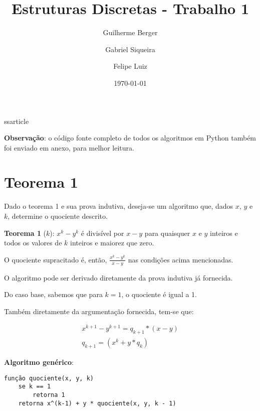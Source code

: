 ss{article}

\usepackage[english]{babel}
\usepackage[utf8]{inputenc}
\usepackage{amsmath}
\usepackage{graphicx}
\usepackage{fancyvrb}
\usepackage{fullpage}
\usepackage{float}
\usepackage{amsmath}
\usepackage{color}
\usepackage{spverbatim}





\title{Estruturas Discretas - Trabalho 1}

\author{Guilherme Berger \and Gabriel Siqueira \and Felipe Luiz}

\date{\today}


\maketitle

\textbf{Observação}: o código fonte completo de todos os algoritmos em Python também foi enviado em anexo, para melhor leitura.

\section{Teorema 1}

Dado o teorema 1 e sua prova indutiva, deseja-se um algoritmo que, dados $x$, $y$ e $k$, determine o quociente descrito.

\textbf{Teorema 1} ($k$): $x^k - y^k$ é divisível por $x-y$ para quaisquer $x$ e $y$ inteiros e todos os valores de $k$ inteiros e maiorez que zero.

O quociente supracitado é, então, $\frac{x^k - y^k}{x-y}$ nas condições acima mencionadas.

O algoritmo pode ser derivado diretamente da prova indutiva já fornecida.

Do caso base, sabemos que para $k = 1$, o quociente é igual a 1.

Também diretamente da argumentação fornecida, tem-se que:

\begin{gather}
x^{k+1} - y^{k+1} = q_{k+1} * (x - y) \\
q_{k+1} = (x^k + y * q_k)
\end{gather}

\textbf{Algoritmo genérico}:

{\color{ogreen}
\begin{verbatim}
função quociente(x, y, k)
    se k == 1
        retorna 1
    retorna x^(k-1) + y * quociente(x, y, k - 1)
\end{verbatim}
}

